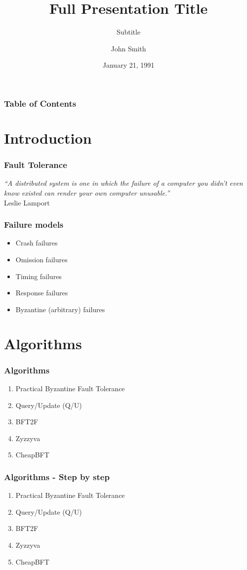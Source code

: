 \documentclass{beamer}
\title[Short Title]{Full Presentation Title}
\subtitle{Subtitle}
\author{John Smith}
\institute[webpage]{Institute \\ Department}
\date{January 21, 1991}
\begin{document}
\begin{frame}
\titlepage
\end{frame}

\begin{frame}
\frametitle{Table of Contents}
\tableofcontents
\end{frame}

\section{Introduction}

\begin{frame}
 \frametitle{Fault Tolerance}
\noindent
 \textit{``A distributed system is one in which the failure of a computer you didn't even know existed can render your own computer unusable.''}
 \\Leslie Lamport
\end{frame}

\begin{frame}
 \frametitle{Failure models}
\begin{itemize}
 \item Crash failures
 \item Omission failures
 \item Timing failures
 \item Response failures
 \item Byzantine (arbitrary) failures
\end{itemize}
\end{frame}

\section{Algorithms}
\begin{frame}
 \frametitle{Algorithms}
\begin{enumerate}
 \item Practical Byzantine Fault Tolerance
 \item Query/Update (Q/U)
 \item BFT2F
 \item Zyzzyva
 \item CheapBFT
\end{enumerate}
\end{frame}

\begin{frame}
 \frametitle{Algorithms - Step by step}
\begin{enumerate}
 \item<1-> Practical Byzantine Fault Tolerance
 \item<2-> Query/Update (Q/U)
 \item<3-> BFT2F
 \item<3-> Zyzzyva
 \item<4-> CheapBFT
\end{enumerate}
\end{frame}
\end{document}

